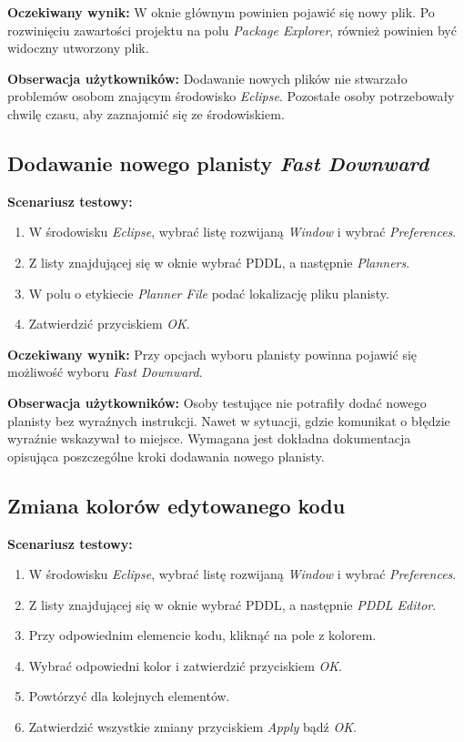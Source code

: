 \textbf{Oczekiwany wynik:} W oknie głównym powinien pojawić się nowy plik. Po rozwinięciu zawartości projektu na polu \textit{Package Explorer}, również powinien być widoczny utworzony plik.

\textbf{Obserwacja użytkowników:} Dodawanie nowych plików nie stwarzało problemów osobom znającym środowisko \textit{Eclipse}. Pozostałe osoby potrzebowały chwilę czasu, aby zaznajomić się ze środowiskiem.  

\subsection{Dodawanie nowego planisty \textit{Fast Downward}}
\textbf{Scenariusz testowy:}
  \begin{enumerate}
  
\item W środowisku \textit{Eclipse}, wybrać listę rozwijaną \textit{Window} i wybrać \textit{Preferences}.
\item Z listy znajdującej się w oknie wybrać PDDL, a następnie \textit{Planners}.
\item W polu o etykiecie \textit{Planner File} podać lokalizację pliku planisty.
\item Zatwierdzić przyciskiem \textit{OK}.
\end{enumerate}

\textbf{Oczekiwany wynik:} Przy opcjach wyboru planisty powinna pojawić się możliwość wyboru \textit{Fast Downward}.

\textbf{Obserwacja użytkowników:} Osoby testujące nie potrafiły dodać nowego planisty bez wyraźnych instrukcji. Nawet w sytuacji, gdzie komunikat o błędzie wyraźnie wskazywał to miejsce. Wymagana jest dokładna dokumentacja opisująca poszczególne kroki dodawania nowego planisty. 
\subsection{Zmiana kolorów edytowanego kodu}
\textbf{Scenariusz testowy:}
  \begin{enumerate}
  
\item W środowisku \textit{Eclipse}, wybrać listę rozwijaną \textit{Window} i wybrać \textit{Preferences}.
\item Z listy znajdującej się w oknie wybrać PDDL, a następnie \textit{PDDL Editor}.
\item Przy odpowiednim elemencie kodu, kliknąć na pole z kolorem.
\item Wybrać odpowiedni kolor i zatwierdzić przyciskiem \textit{OK}.
\item Powtórzyć dla kolejnych elementów.
\item Zatwierdzić wszystkie zmiany przyciskiem \textit{Apply} bądź \textit{OK}.

\end{enumerate}

